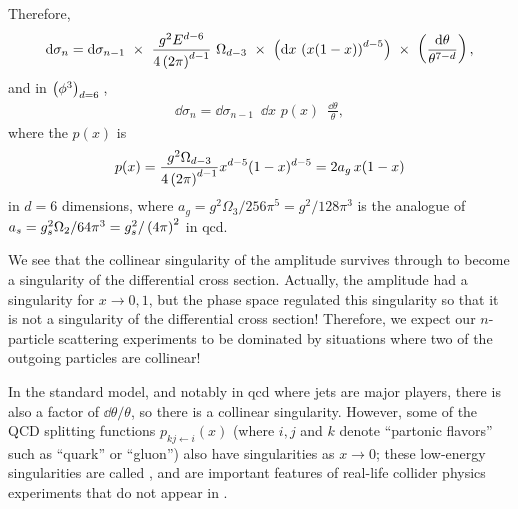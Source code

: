 Therefore,
\begin{align}
    \dd\sigma_n
    =
    \dd \sigma_{n-1}
    \,\,
    \times
    \,\,
    \frac{g^2 E^{d-6}}{4\left(2\pi\right)^{d-1}}
    \,\,
    \Omega_{d-3}
    \,\,
    \times
    \,\,
    \left(
        \dd x
        \,
        \left( x (1-x) \right)^{d-5}
    \right)
    \,\,
    \times
    \,\,
    \left(
        \frac{\dd\theta}{\theta^{7-d}}
    \right)
    ,
\end{align}
and in \(\left(\phi^3\right)_{d=6}{}\),
\begin{align}
    \dd\sigma_n
    =
    \dd \sigma_{n-1}
    \,\,\,
    \dd x\,\, p(x)
    \,\,\,
    \frac{\dd \theta}{\theta}
    ,
\end{align}
where the  \(p(x)\) is
\begin{align}
    p(x)
    =
    \frac{g^2\Omega_{d-3}}{4 \left(2 \pi\right)^{d-1}}
    x^{d-5}(1-x)^{d-5}
    =
    2 a_g\, x(1-x)
\end{align}
in \(d=6\) dimensions, where \(a_g = g^2 \Omega_3 / 256 \pi^5 = g^2 / 128 \pi^3\) is the analogue of \(a_s = g_s^2 \Omega_2 / 64 \pi^3 = g_s^2 / \left(4 \pi\right)^2\) in \gls{qcd}.

We see that the collinear singularity of the amplitude survives through to become a singularity of the differential cross section.
%
Actually, the amplitude had a singularity for \(x \to 0, 1\), but the phase space regulated this singularity so that it is not a singularity of the differential cross section!
%
Therefore, we expect our \(n\)-particle scattering experiments to be dominated by situations where two of the outgoing particles are collinear!

In the standard model, and notably in \gls{qcd} where jets are major players, there is also a factor of \(\dd\theta/\theta\), so there is a collinear singularity.
%
However, some of the QCD splitting functions \(p_{kj\leftarrow i}(x)\) (where \(i, j\) and \(k\) denote ``partonic flavors'' such as ``quark'' or ``gluon'') also have singularities as \(x \to 0\);
%
these low-energy singularities are called , and are important features of real-life collider physics experiments that do not appear in \phicubedsix.







